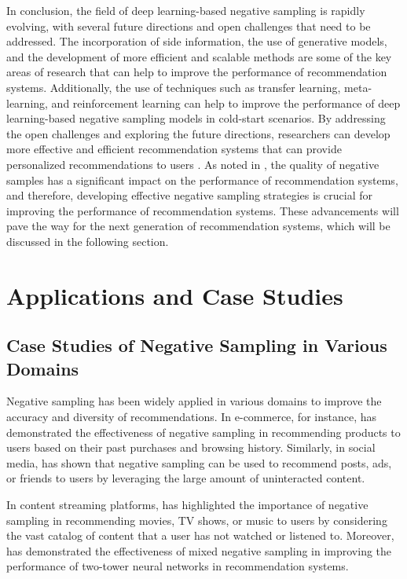 \documentclass[11pt,a4paper]{article}
\begin{document}
In conclusion, the field of deep learning-based negative sampling is rapidly evolving, with several future directions and open challenges that need to be addressed. The incorporation of side information, the use of generative models, and the development of more efficient and scalable methods are some of the key areas of research that can help to improve the performance of recommendation systems. Additionally, the use of techniques such as transfer learning, meta-learning, and reinforcement learning can help to improve the performance of deep learning-based negative sampling models in cold-start scenarios. By addressing the open challenges and exploring the future directions, researchers can develop more effective and efficient recommendation systems that can provide personalized recommendations to users \cite{doi:10.1109/tbdata.2023.3300547}. As noted in \cite{arxiv:2402.19195}, the quality of negative samples has a significant impact on the performance of recommendation systems, and therefore, developing effective negative sampling strategies is crucial for improving the performance of recommendation systems. These advancements will pave the way for the next generation of recommendation systems, which will be discussed in the following section.


\section{Applications and Case Studies}



\subsection{Case Studies of Negative Sampling in Various Domains}


Negative sampling has been widely applied in various domains to improve the accuracy and diversity of recommendations. In e-commerce, for instance, \cite{doi:10.1137/1.9781611972818.33} has demonstrated the effectiveness of negative sampling in recommending products to users based on their past purchases and browsing history. Similarly, in social media, \cite{doi:10.1145/2983323.2983874} has shown that negative sampling can be used to recommend posts, ads, or friends to users by leveraging the large amount of uninteracted content.

In content streaming platforms, \cite{arxiv:1708.06816} has highlighted the importance of negative sampling in recommending movies, TV shows, or music to users by considering the vast catalog of content that a user has not watched or listened to. Moreover, \cite{doi:10.1145/3366424.3386195} has demonstrated the effectiveness of mixed negative sampling in improving the performance of two-tower neural networks in recommendation systems.
\end{document}
